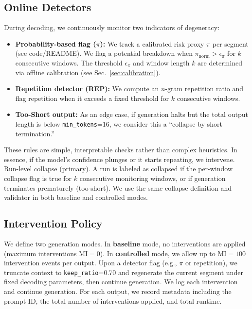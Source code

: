 \documentclass{article}
\begin{document}
\subsection{Online Detectors}
During decoding, we continuously monitor two indicators of degeneracy:
\begin{itemize}
  \item \textbf{Probability-based flag ($\pi$):} We track a calibrated risk proxy $\pi$ per segment (see code/README). We flag a potential breakdown when $\pi_{\text{norm}} > \epsilon_{\pi}$ for $k$ consecutive windows. The threshold $\epsilon_{\pi}$ and window length $k$ are determined via offline calibration (see Sec.~\ref{sec:calibration}).
  \item \textbf{Repetition detector (REP):} We compute an $n$-gram repetition ratio and flag repetition when it exceeds a fixed threshold for $k$ consecutive windows.
  \item \textbf{Too-Short output:} As an edge case, if generation halts but the total output length is below \texttt{min\_tokens}=16, we consider this a ``collapse by short termination.''
\end{itemize}
These rules are simple, interpretable checks rather than complex heuristics. In essence, if the model's confidence plunges or it starts repeating, we intervene.
Run-level collapse (primary). A run is labeled as collapsed if the per-window collapse flag is true for $k$ consecutive monitoring windows, or if generation terminates prematurely (too-short). We use the same collapse definition and validator in both baseline and controlled modes.

\subsection{Intervention Policy}
We define two generation modes. In \textbf{baseline} mode, no interventions are applied (maximum interventions $\text{MI}=0$). In \textbf{controlled} mode, we allow up to $\text{MI}=100$ intervention events per output. Upon a detector flag (e.g., $\pi$ or repetition), we truncate context to \texttt{keep\_ratio}=0.70 and regenerate the current segment under fixed decoding parameters, then continue generation. We log each intervention and continue generation. For each output, we record metadata including the prompt ID, the total number of interventions applied, and total runtime.
\end{document}
